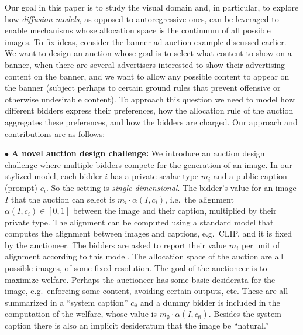 \documentclass[format=acmsmall, review=false]{acmart}
\begin{document}
\smallskip Our goal in this paper is to study the visual domain and, in particular, to explore how {\em diffusion models}, as opposed to autoregressive ones, can be leveraged to enable mechanisms whose allocation space is the continuum of all possible images.
To fix ideas, consider the banner ad auction example discussed earlier. We want to design an auction whose goal is to select what content to show on a banner, when there are several advertisers interested to show their advertising content on the banner, and we want to allow any possible content to appear on the banner (subject perhaps to certain ground rules that prevent offensive or otherwise undesirable content). To approach this question we need to model how different bidders express their preferences, how the allocation rule of the auction aggregates these preferences, and how the bidders are charged. Our approach and contributions are as follows:

\smallskip \noindent $\bullet$ \textbf{A novel auction design challenge:} We introduce an auction design challenge where multiple bidders compete for the generation of an image. In our stylized model, each bidder $i$ has a private scalar type $m_i$ and a public caption (prompt) $c_i$. So the setting is {\em single-dimensional}. The bidder's value for an image $I$ that the auction can select is $m_i \cdot \alpha(I,c_i)$, i.e.~the alignment $\alpha(I,c_i) \in [0,1]$ between the image and their caption, multiplied by their private type. The alignment can be computed using a standard model that computes the alignment between images and captions, e.g.~CLIP, and it is fixed by the auctioneer. The bidders are asked to report their value $m_i$ per unit of alignment according to this model. The allocation space of the auction are all possible images, of some fixed resolution. The goal of the auctioneer is to maximize welfare. Perhaps the auctioneer has some basic desiderata for the image, e.g.~enforcing some content, avoiding certain outputs, etc. These are all summarized in a ``system caption'' $c_{\emptyset}$ and a dummy bidder is included in the computation of the welfare, whose value is $m_{\emptyset} \cdot \alpha(I,c_\emptyset)$. Besides the system caption there is also an implicit desideratum that the image be ``natural.''
    
    
    
\end{document}
